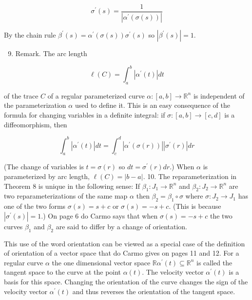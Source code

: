 \documentclass[10pt]{article}
\begin{document}
$$
\sigma^{\prime}(s)=\frac{1}{\left|\alpha^{\prime}(\sigma(s))\right|}
$$

By the chain rule $\beta^{\prime}(s)=\alpha^{\prime}(\sigma(s)) \sigma^{\prime}(s)$ so $\left|\beta^{\prime}(s)\right|=1$.

\begin{enumerate}
  \setcounter{enumi}{8}
  \item Remark. The arc length
\end{enumerate}

$$
\ell(C)=\int_{a}^{b}\left|\alpha^{\prime}(t)\right| d t
$$

of the trace $C$ of a regular parameterized curve $\alpha:[a, b] \rightarrow \mathbb{R}^{n}$ is independent of the parameterization $\alpha$ used to define it. This is an easy consequence of the formula for changing variables in a definite integral: if $\sigma:[a, b] \rightarrow[c, d]$ is a diffeomorphism, then

$$
\int_{a}^{b}\left|\alpha^{\prime}(t)\right| d t=\int_{c}^{d}\left|\alpha^{\prime}(\sigma(r))\right|\left|\sigma^{\prime}(r)\right| d r
$$

(The change of variables is $t=\sigma(r)$ so $d t=\sigma^{\prime}(r) d r$.) When $\alpha$ is parameterized by arc length, $\ell(C)=|b-a|$. 10. The reparameterization in Theorem 8 is unique in the following sense: If $\beta_{1}: J_{1} \rightarrow \mathbb{R}^{n}$ and $\beta_{2}: J_{2} \rightarrow \mathbb{R}^{n}$ are two reparameterizations of the same map $\alpha$ then $\beta_{2}=\beta_{1} \circ \sigma$ where $\sigma: J_{2} \rightarrow J_{1}$ has one of the two forms $\sigma(s)=s+c$ or $\sigma(s)=-s+c$. (This is because $\left|\sigma^{\prime}(s)\right|=1$.) On page 6 do Carmo says that when $\sigma(s)=-s+c$ the two curves $\beta_{1}$ and $\beta_{2}$ are said to differ by a change of orientation.

This use of the word orientation can be viewed as a special case of the definition of orientation of a vector space that do Carmo gives on pages 11 and 12. For a regular curve $\alpha$ the one dimensional vector space $\mathbb{R} \alpha^{\prime}(t) \subseteq \mathbb{R}^{n}$ is called the tangent space to the curve at the point $\alpha(t)$. The velocity vector $\alpha^{\prime}(t)$ is a basis for this space. Changing the orientation of the curve changes the sign of the velocity vector $\alpha^{\prime}(t)$ and thus reverses the orientation of the tangent space.
\end{document}
